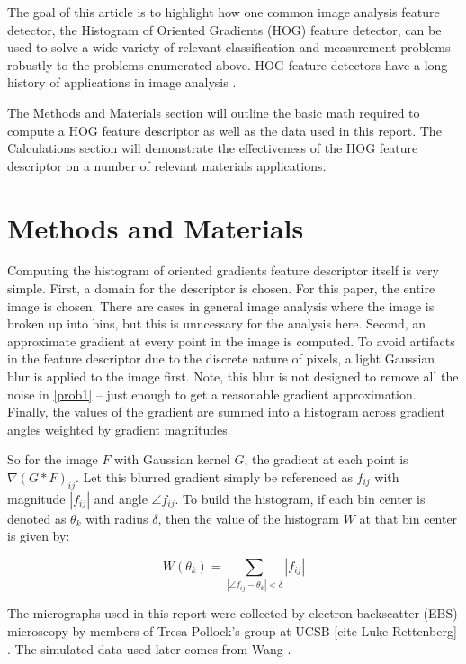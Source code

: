 \documentclass[review]{elsarticle}
\begin{document}
	The goal of this article is to highlight how one common image analysis feature detector, the Histogram of Oriented Gradients (HOG) feature detector, can be used to solve a wide variety of relevant classification and measurement problems robustly to the problems enumerated above. HOG feature detectors have a long history of applications in image analysis \cite{gradtex, hog, girsh}.

	The Methods and Materials section will outline the basic math required to compute a HOG feature descriptor as well as the data used in this report. The Calculations section will demonstrate the effectiveness of the HOG feature descriptor on a number of relevant materials applications.

	\section{Methods and Materials}
	Computing the histogram of oriented gradients feature descriptor itself is very simple. First, a domain for the descriptor is chosen. For this paper, the entire image is chosen. There are cases in general image analysis where the image is broken up into bins, but this is unncessary for the analysis here. Second, an approximate gradient at every point in the image is computed. To avoid artifacts in the feature descriptor due to the discrete nature of pixels, a light Gaussian blur is applied to the image first. Note, this blur is not designed to remove all the noise in \ref{prob1} -- just enough to get a reasonable gradient approximation. Finally, the values of the gradient are summed into a histogram across gradient angles weighted by gradient magnitudes.

	So for the image $F$ with Gaussian kernel $G$, the gradient at each point is $\nabla \left( G \ast F \right)_{ij}$. Let this blurred gradient simply be referenced as $f_{ij}$ with magnitude $\left| f_{ij} \right|$ and angle $\angle f_{ij}$. To build the histogram, if each bin center is denoted as $\theta_k$ with radius $\delta$, then the value of the histogram $W$ at that bin center is given by:
	
	\begin{equation}
		W \left( \theta_k \right) = \sum_{\left| \angle f_{ij} - \theta_k \right| < \delta} \left| f_{ij} \right|
	\end{equation}

	The micrographs used in this report were collected by electron backscatter (EBS) microscopy by members of Tresa Pollock's group at UCSB [cite Luke Rettenberg] \cite{tribeam}. The simulated data used later comes from Wang \cite{ywang2}.
	
\end{document}
